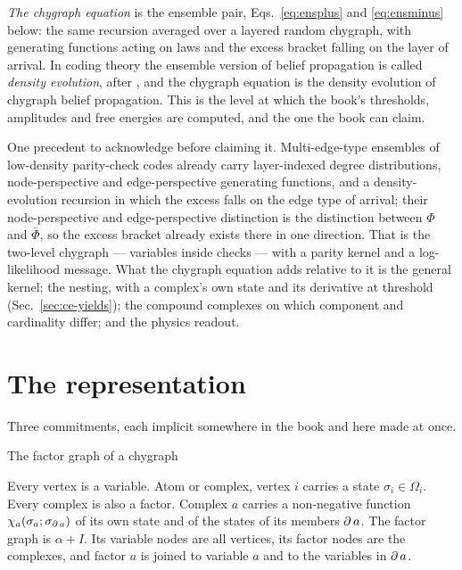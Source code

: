 \emph{The chygraph equation} is the ensemble pair,
Eqs.~\eqref{eq:ensplus} and \eqref{eq:ensminus} below: the same recursion
averaged over a layered random chygraph, with generating functions acting
on laws and the excess bracket falling on the layer of arrival. In coding theory the ensemble version of
belief propagation is called \emph{density evolution}, after
\citet{richardson2008}, and the chygraph equation is the density evolution of chygraph belief
propagation. This is the level at which the book's thresholds, amplitudes and
free energies are computed, and the one the book can claim.

One precedent to acknowledge before claiming it. Multi-edge-type ensembles of
low-density parity-check codes \citep[Ch.~7]{richardson2008} already carry
layer-indexed degree distributions, node-perspective and edge-perspective
generating functions, and a density-evolution recursion in which the excess
falls on the edge type of arrival; their node-perspective and edge-perspective
distinction is the distinction between $\Phi$ and $\bar\Phi$, so the excess
bracket already exists there in one direction. That is the two-level chygraph ---
variables inside checks --- with a parity kernel and a log-likelihood message.
What the chygraph equation adds relative to it is the general kernel; the
nesting, with a complex's own state and its derivative at threshold
(Sec.~\ref{sec:ce-yields}); the compound complexes on which component and
cardinality differ; and the physics readout.

\section{The representation}
\label{sec:ce-representation}

Three commitments, each implicit somewhere in the book and here made at once.

\begin{model}{The factor graph of a chygraph}
\begin{rules}
 Every vertex is a variable. Atom or complex, vertex $i$
carries a state $\sigma_{i}\in\Omega_{i}$.
 Every complex is also a factor. Complex $a$ carries a
non-negative function $\chi_{a}(\sigma_{a};\sigma_{\operatorname{\partial} a})$ of its own state
and of the states of its members $\operatorname{\partial} a$.
 The factor graph is $\alpha+I$. Its variable nodes are all
vertices, its factor nodes are the complexes, and factor $a$ is joined to
variable $a$ and to the variables in $\operatorname{\partial} a$.
\end{rules}
\end{model}

